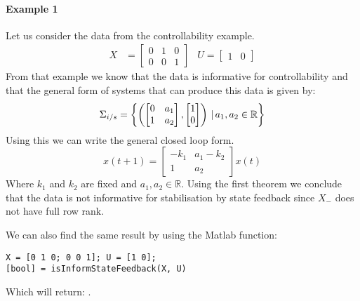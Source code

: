 \paragraph*{Example 1}
Let us consider the data from the controllability example.
\begin{align*}
X &= \begin{bmatrix} 0&1&0 \\ 0&0&1 \end{bmatrix} & U = \begin{bmatrix}	1&0	\end{bmatrix}
\end{align*} 
From that example we know that the data is informative for controllability and that the general form of systems that can produce this data is given by:
\[ \Sigma_{i/s} = \left\{ \left( \begin{bmatrix} 0&a_1 \\ 1&a_2 \end{bmatrix}, \begin{bmatrix} 1 \\ 0 \end{bmatrix} \right) \, | \, a_1, a_2 \in \mathbb{R} \right\} \]
Using this we can write the general closed loop form.
\[ x(t+1) = \begin{bmatrix}
-k_1 & a_1 - k_2 \\ 1 & a_2
\end{bmatrix} x(t) \]
Where $k_1$ and $k_2$ are fixed and $a_1 , a_2 \in \mathbb{R}$. Using the first theorem we conclude that the data is not informative for stabilisation by state feedback since $X_-$ does not have full row rank. 

We can also find the same result by using the Matlab function:
\begin{lstlisting}
X = [0 1 0; 0 0 1]; U = [1 0];
[bool] = isInformStateFeedback(X, U)
\end{lstlisting}
Which will return: \mon{[ 0 ]}.

